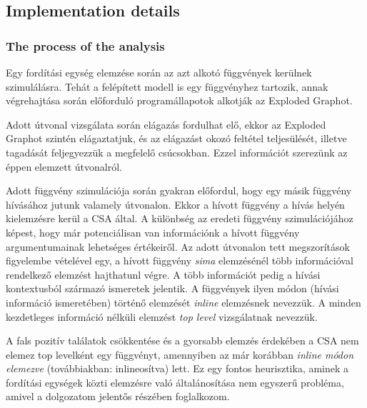 \documentclass[oneside, a4paper, 12pt]{article}
\theoremstyle{definition}
\begin{document}
\subsection{Implementation details}
\subsubsection{The process of the analysis}
Egy fordítási egység elemzése során az azt alkotó függvények kerülnek
szimulálásra. Tehát a felépített modell is egy függvényhez tartozik,
annak végrehajtása során előforduló programállapotok alkotják az Exploded 
Graphot. 

Adott útvonal vizsgálata során elágazás fordulhat elő, ekkor az Exploded 
Graphot szintén elágaztatjuk,
és az elágazást okozó feltétel teljesülését, illetve tagadását feljegyezzük a 
megfelelő csúcsokban.
Ezzel információt szerezünk az éppen elemzett útvonalról.

Adott függvény szimulációja során gyakran előfordul, hogy egy másik függvény 
hívásához jutunk valamely útvonalon.
Ekkor a hívott függvény a hívás helyén kielemzésre kerül a CSA által.
A különbség az eredeti függvény szimulációjához képest, hogy már potenciálisan 
van információnk a hívott függvény argumentumainak lehetséges értékeiről.
Az adott útvonalon tett megszorítások figyelembe vételével egy, a hívott 
függvény \textit{sima} elemzésénél több információval rendelkező elemzést 
hajthatunl végre.
A több információt pedig a hívási kontextusból származó ismeretek jelentik.
A függvények ilyen módon (hívási információ ismeretében) történő elemzését 
\textit{inline} elemzésnek nevezzük.
A minden kezdetleges információ nélküli elemzést \textit{top level} 
vizsgálatnak nevezzük.

A fals pozitív találatok csökkentése és a gyorsabb elemzés érdekében a CSA nem 
elemez top levelként egy függvényt,
amennyiben az már korábban \textit{inline módon elemezve} (továbbiakban: 
inlineosítva) lett. Ez egy fontos 
heurisztika, aminek a fordítási egységek közti elemzésre való általánosítása 
nem egyszerű probléma, amivel
a dolgozatom jelentős részében foglalkozom.
\end{document}
